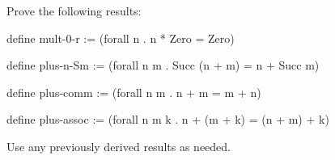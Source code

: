 %
%
Prove the following results:
\begin{tcAthena}
define mult-0-r :=   (forall n . n * Zero = Zero)

define plus-n-Sm :=  (forall n m . Succ (n + m) = n + Succ m)

define plus-comm :=  (forall n m . n + m = m + n)

define plus-assoc := (forall n m k . n + (m + k) = (n + m) + k)
\end{tcAthena}
Use any previously derived results as needed.
